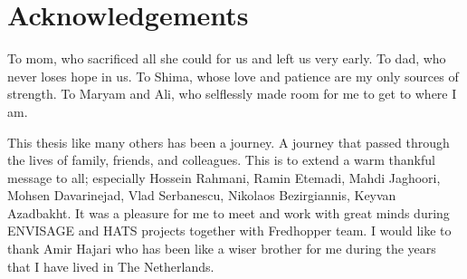 %
\chapter*{Acknowledgements}
\label{sec:acknowledgement}
\vspace*{-10mm}

To mom, who sacrificed all she could for us and left us very early.
To dad, who never loses hope in us.
To Shima, whose love and patience are my only sources of strength.
To Maryam and Ali, who selflessly made room for me to get to where I am.

This thesis like many others has been a journey.
A journey that passed through the lives of family, friends, and colleagues.
This is to extend a warm thankful message to all; especially
Hossein Rahmani, Ramin Etemadi, Mahdi Jaghoori, Mohsen Davarinejad,
Vlad Serbanescu, Nikolaos Bezirgiannis, Keyvan Azadbakht.
It was a pleasure for me to meet and work with great minds during
ENVISAGE and HATS projects together with Fredhopper team.
I would like to thank Amir Hajari who has been like a wiser brother 
for me during the years that I have lived in The Netherlands.
